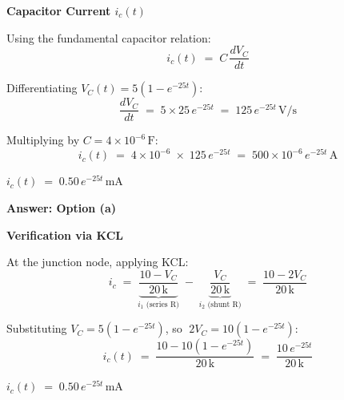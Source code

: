 \documentclass[12pt]{beamer}
\begin{document}
\begin{frame}{\textbf{Capacitor Current $i_c(t)$}}
  \begin{center}
    \vfill
    Using the fundamental capacitor relation:
    \[
      i_c(t) \;=\; C\,\frac{dV_C}{dt}
    \]

    \vspace{0.6em}
    Differentiating $V_C(t) = 5(1 - e^{-25t})$:
    \[
      \frac{dV_C}{dt} \;=\; 5 \times 25\,e^{-25t} \;=\; 125\,e^{-25t}\,\mathrm{V/s}
    \]

    \vspace{0.6em}
    Multiplying by $C = 4 \times 10^{-6}\,\mathrm{F}$:
    \[
      i_c(t) \;=\; 4\times10^{-6} \;\times\; 125\,e^{-25t}
             \;=\; 500\times10^{-6}\,e^{-25t}\,\mathrm{A}
    \]

    \vspace{1em}
    \LARGE\textbf{\textcolor{madblue}{$i_c(t) \;=\; 0.50\,e^{-25t}\,\mathrm{mA}$}}

    \vspace{0.5em}
    \normalsize\textbf{\textcolor{okgreen}{Answer: Option (a)}}
    \vfill
  \end{center}
\end{frame}

\begin{frame}{\textbf{Verification via KCL}}
  \begin{center}
    \vfill
    At the junction node, applying KCL:
    \[
      i_c \;=\; \underbrace{\frac{10 - V_C}{20\,\mathrm{k}}}_{i_1\text{ (series R)}}
               \;-\;
               \underbrace{\frac{V_C}{20\,\mathrm{k}}}_{i_2\text{ (shunt R)}}
             \;=\; \frac{10 - 2V_C}{20\,\mathrm{k}}
    \]

    \vspace{0.8em}
    Substituting $V_C = 5(1 - e^{-25t})$, so $\;2V_C = 10(1 - e^{-25t})$:
    \[
      i_c(t) \;=\; \frac{10 - 10(1 - e^{-25t})}{20\,\mathrm{k}}
             \;=\; \frac{10\,e^{-25t}}{20\,\mathrm{k}}
    \]

    \vspace{1em}
    \Large\textbf{\textcolor{madblue}{$i_c(t) \;=\; 0.50\,e^{-25t}\,\mathrm{mA}$}}\;
    \textcolor{okgreen}{\checkmark}
    \vfill
  \end{center}
\end{frame}
\end{document}
